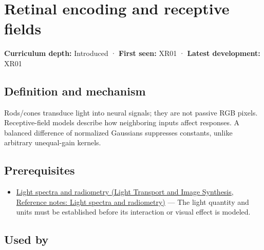 \hypertarget{appendix-7281c15ac44a}{}\label{referencestart:appendix-7281c15ac44a}
\section{Retinal encoding and receptive fields}\label{appendix-7281c15ac44a-retinal-encoding-and-receptive-fields}

\hypertarget{appendix-7281c15ac44a-retinal-encoding-and-receptive-fields}{}

\textbf{Curriculum depth:} Introduced · \textbf{First seen:} XR01 · \textbf{Latest development:} XR01

\begin{allmightroledefinition}

\subsection{Definition and mechanism}\label{appendix-7281c15ac44a-definition-and-mechanism}

\hypertarget{appendix-7281c15ac44a-definition-and-mechanism}{}

Rods/cones transduce light into neural signals; they are not passive RGB pixels. Receptive-field models describe how neighboring inputs affect responses. A balanced difference of normalized Gaussians suppresses constants, unlike arbitrary unequal-gain kernels.

\end{allmightroledefinition}

\subsection{Prerequisites}\label{appendix-7281c15ac44a-prerequisites}

\hypertarget{appendix-7281c15ac44a-prerequisites}{}

\begin{itemize}
\tightlist
\item
  \href{../04-Light-Transport-and-Image-Synthesis/main.pdf\#nameddest=appendix-215c2570199b}{Light spectra and radiometry (Light Transport and Image Synthesis, Reference notes: Light spectra and radiometry)} --- The light quantity and units must be established before its interaction or visual effect is modeled.
\end{itemize}

\subsection{Used by}\label{appendix-7281c15ac44a-used-by}

